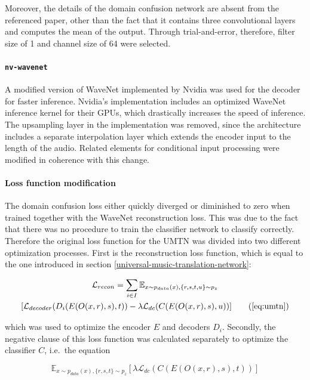 \documentclass[12pt,a4paper,]{report}
\begin{document}
Moreover, the details of the domain confusion network are absent from
the referenced paper, other than the fact that it contains three
convolutional layers and computes the mean of the output. Through
trial-and-error, therefore, filter size of 1 and channel size of 64 were
selected.

\paragraph{\texttt{nv-wavenet}}

A modified version of WaveNet implemented by Nvidia was used for the
decoder for faster inference. Nvidia's implementation includes an
optimized WaveNet inference kernel for their GPUs, which drastically
increases the speed of inference. The upsampling layer in the
implementation was removed, since the architecture includes a separate
interpolation layer which extends the encoder input to the length of the
audio. Related elements for conditional input processing were modified
in coherence with this change.

\paragraph{Loss function modification \label{loss-function-modification}}

The domain confusion loss either quickly diverged or diminished to zero
when trained together with the WaveNet reconstruction loss. This was due
to the fact that there was no procedure to train the classifier network
to classify correctly. Therefore the original loss function for the UMTN
was divided into two different optimization processes. First is the
reconstruction loss function, which is equal to the one introduced in
section \ref{universal-music-translation-network}:

\begin{multline}
    \mathcal{L}_{recon} = \sum_{i \in I} \mathbb{E}_{x \sim p_{data}(x), \{r, s, t, u\} \sim p_{z}} \\
    [\mathcal{L}_{decoder}(D_i(E(O(x, r), s), t))  - \lambda \mathcal{L}_{dc}(C(E(O(x, r), s), u))] \tag{\ref{eq:umtn}}
\end{multline}

which was used to optimize the encoder \(E\) and decoders \(D_i\).
Secondly, the negative clause of this loss function was calculated
separately to optimize the classifier \(C\), i.e.~the equation

\begin{equation}
    \mathbb{E}_{x \sim p_{data}(x), \{r, s, t\} \sim p_{z}} [\lambda \mathcal{L}_{dc}(C(E(O(x, r), s), t))] \label{eq:dcloss}
\end{equation}
\end{document}
